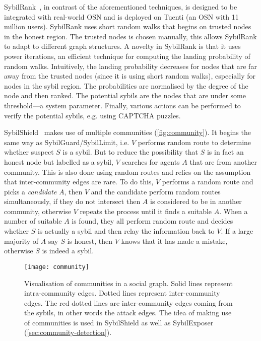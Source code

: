 SybilRank~\cite{cao2012aiding}, in contrast of the aforementioned techniques, is
designed to be integrated with real-world OSN and is deployed on Tuenti (an OSN
with 11 million users). SybilRank uses short random walks that begins on trusted
nodes in the honest region. The trusted nodes is chosen manually, this allows
SybilRank to adapt to different graph structures. A novelty in SybilRank is that
it uses power iterations, an efficient technique for computing the landing
probability of random walks. Intuitively, the landing probability decreases for
nodes that are far away from the trusted nodes (since it is using short random
walks), especially for nodes in the sybil region. The probabilities are
normalised by the degree of the node and then ranked. The potential sybils are
the nodes that are under some threshold---a system parameter. Finally, various
actions can be performed to verify the potential sybils, e.g. using CAPTCHA
puzzles.

SybilShield~\cite{shi2013sybilshield} makes use of multiple communities
(\autoref{fig:community}). It begins the same way as
SybilGuard/SybilLimit, i.e. $V$ performs random route to determine whether
suspect $S$ is a sybil. But to reduce the possibility that $S$ is in fact an
honest node but labelled as a sybil, $V$ searches for agents $A$ that are from
another community. This is also done using random routes and relies on the
assumption that inter-community edges are rare. To do this, $V$ performs a
random route and picks a \emph{candidate} $A$, then $V$ and the candidate
perform random routes simultaneously, if they do not intersect then $A$ is
considered to be in another community, otherwise $V$ repeats the process until
it finds a suitable $A$. When a number of suitable $A$ is found, they all
perform random route and decides whether $S$ is actually a sybil and then relay
the information back to $V$. If a large majority of $A$ say $S$ is honest, then
$V$ knows that it has made a mistake, otherwise $S$ is indeed a sybil.

\begin{figure}
  \centering
  \texttt{[image: community]}
  \caption{Visualisation of communities in a social graph. Solid lines represent
    intra-community edges. Dotted lines represent inter-community edges. The red
    dotted lines are inter-community edges coming from the sybils, in other
    words the attack edges. The idea of making use of communities is used in
    SybilShield as well as SybilExposer
    (\autoref{sec:community-detection}).}
  \label{fig:community}
\end{figure}

